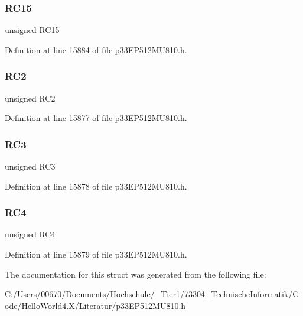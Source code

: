 \subsubsection{\texorpdfstring{R\+C15}{RC15}}
{\footnotesize\ttfamily unsigned R\+C15}



Definition at line 15884 of file p33\+E\+P512\+M\+U810.\+h.

\mbox{\label{structtag_p_o_r_t_c_b_i_t_s_a2155381890524f46a1a03878e5f52682}} 
\subsubsection{\texorpdfstring{R\+C2}{RC2}}
{\footnotesize\ttfamily unsigned R\+C2}



Definition at line 15877 of file p33\+E\+P512\+M\+U810.\+h.

\mbox{\label{structtag_p_o_r_t_c_b_i_t_s_ae6cab3544e1e4b7eaec41046bf007800}} 
\subsubsection{\texorpdfstring{R\+C3}{RC3}}
{\footnotesize\ttfamily unsigned R\+C3}



Definition at line 15878 of file p33\+E\+P512\+M\+U810.\+h.

\mbox{\label{structtag_p_o_r_t_c_b_i_t_s_aed6dec1d13dadc4721b39d5431fca93e}} 
\subsubsection{\texorpdfstring{R\+C4}{RC4}}
{\footnotesize\ttfamily unsigned R\+C4}



Definition at line 15879 of file p33\+E\+P512\+M\+U810.\+h.



The documentation for this struct was generated from the following file\+:\begin{DoxyCompactItemize}
\item 
C\+:/\+Users/00670/\+Documents/\+Hochschule/\+\_\+\+Tier1/73304\+\_\+\+Technische\+Informatik/\+Code/\+Hello\+World4.\+X/\+Literatur/\hyperlink{p33_e_p512_m_u810_8h}{p33\+E\+P512\+M\+U810.\+h}\end{DoxyCompactItemize}
